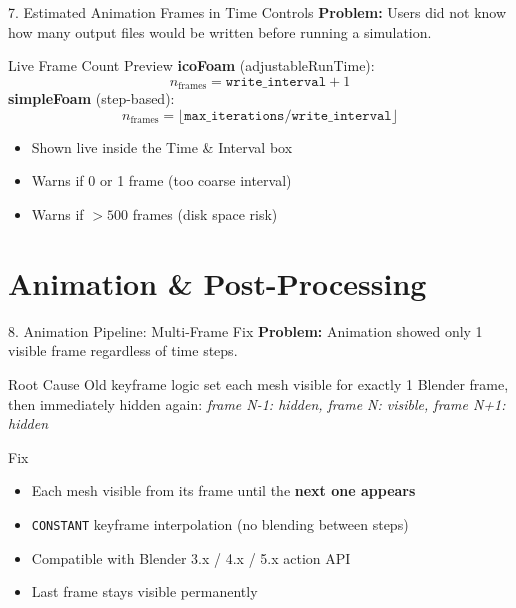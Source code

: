 \documentclass[dvipsnames,mathserif]{beamer}
\begin{document}
\begin{frame}{7. Estimated Animation Frames in Time Controls}
    \textbf{Problem:} Users did not know how many output files would be written before running a simulation.
    \vspace{0.2cm}
    \begin{block}{Live Frame Count Preview}
        \textbf{icoFoam} (adjustableRunTime):
        \[
            n_{\text{frames}} = \texttt{write\_interval} + 1
        \]
        \textbf{simpleFoam} (step-based):
        \[
            n_{\text{frames}} = \lfloor \texttt{max\_iterations} / \texttt{write\_interval} \rfloor
        \]
        \begin{itemize}
            \item Shown live inside the Time \& Interval box
            \item Warns if 0 or 1 frame (too coarse interval)
            \item Warns if $>500$ frames (disk space risk)
        \end{itemize}
    \end{block}
\end{frame}

\section{Animation \& Post-Processing}
\begin{frame}{8. Animation Pipeline: Multi-Frame Fix}
    \textbf{Problem:} Animation showed only 1 visible frame regardless of time steps.
    \vspace{0.2cm}
    \begin{block}{Root Cause}
        Old keyframe logic set each mesh visible for exactly 1 Blender frame, then immediately hidden again:
        \textit{frame N-1: hidden, frame N: visible, frame N+1: hidden}
    \end{block}
    \begin{block}{Fix}
        \begin{itemize}
            \item Each mesh visible from its frame until the \textbf{next one appears}
            \item \texttt{CONSTANT} keyframe interpolation (no blending between steps)
            \item Compatible with Blender 3.x / 4.x / 5.x action API
            \item Last frame stays visible permanently
        \end{itemize}
    \end{block}
\end{frame}
\end{document}
